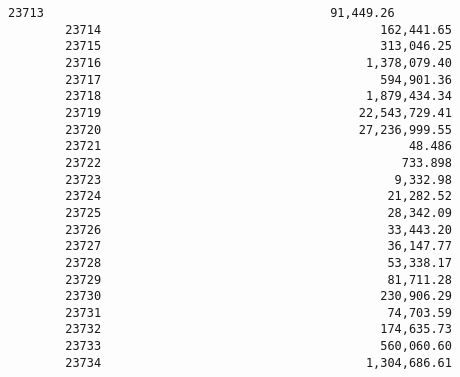 \documentclass[11pt]{article}
\begin{document}
\begin{Verbatim}[commandchars=\\\{\}]
        23713                                        91,449.26   
        23714                                       162,441.65   
        23715                                       313,046.25   
        23716                                     1,378,079.40   
        23717                                       594,901.36   
        23718                                     1,879,434.34   
        23719                                    22,543,729.41   
        23720                                    27,236,999.55   
        23721                                           48.486   
        23722                                          733.898   
        23723                                         9,332.98   
        23724                                        21,282.52   
        23725                                        28,342.09   
        23726                                        33,443.20   
        23727                                        36,147.77   
        23728                                        53,338.17   
        23729                                        81,711.28   
        23730                                       230,906.29   
        23731                                        74,703.59   
        23732                                       174,635.73   
        23733                                       560,060.60   
        23734                                     1,304,686.61   
        

\end{Verbatim}
\end{document}
